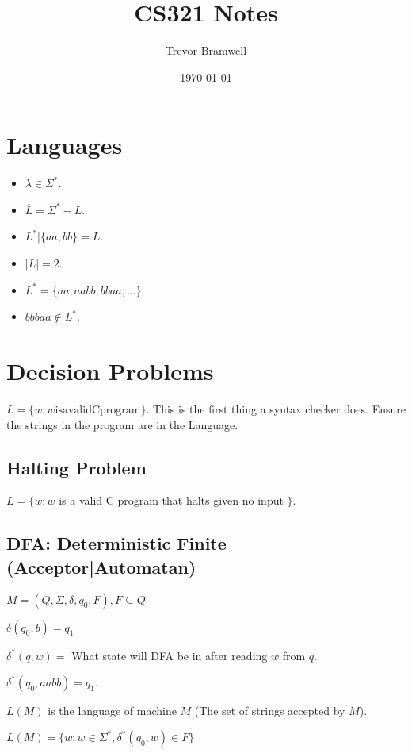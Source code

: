 \documentclass[12pt]{article}
\title{CS321 Notes}
\author{
    Trevor Bramwell \\
}
\date{\today}
\begin{document}
\maketitle

\section*{Languages}

\begin{itemize}
    \item $\lambda \in \Sigma^*$.

    \item $\overline{L} = \Sigma^* - L$.

    \item $L^* | \{aa, bb\} = L$.

    \item $|L| = 2$.

    \item $L^* = \{aa, aabb, bbaa, \ldots \}$.
    \item $bbbaa \notin L^*$.
\end{itemize}

\section*{Decision Problems}
$L = \{ w : w \mathrm{is a valid C program} \}$.
This is the first thing a syntax checker does. Ensure the strings in the
program are in the Language.

\subsection*{Halting Problem}
$L = \{ w : w $ is a valid C program that halts given no input $ \}$.

\subsection*{DFA: Deterministic Finite (Acceptor|Automatan)}

$M = (Q, \Sigma, \delta, q_0, F), F \subseteq Q$

$\delta(q_0, b) = q_1$

$\delta^*(q, w) = $ What state will DFA be in after reading $w$ from $q$.

$\delta^*(q_0, aabb) = q_1$.

$L(M) $ is the language of machine $M$ (The set of strings accepted by
$M$).

$L(M) = \{ w : w \in \Sigma^*, \delta^*(q_0, w) \in F \}$
\end{document}
